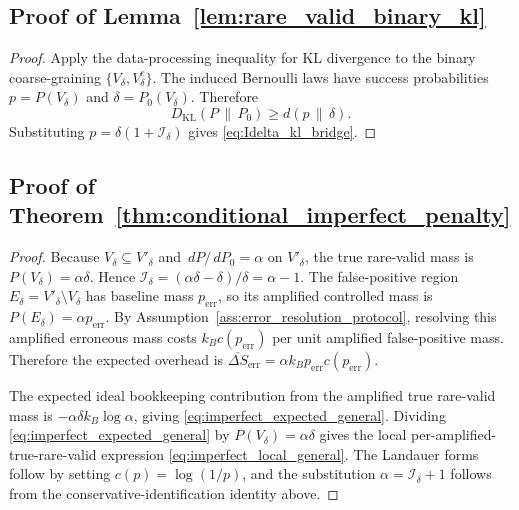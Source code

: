 \documentclass[
  aps,
  prresearch,
  reprint,
  amsmath,
  amssymb,
  superscriptaddress,
  nofootinbib,
  longbibliography
]{revtex4-2}
\newcommand{\KL}{D_{\mathrm{KL}}}
\newcommand{\calI}{\mathcal{I}}
\newcommand{\dd}{\,d}
\begin{document}
\subsection{Proof of Lemma~\ref{lem:rare_valid_binary_kl}}
\begin{proof}
Apply the data-processing inequality for KL divergence to the binary coarse-graining \(\{V_\delta,V_\delta^c\}\). The induced Bernoulli laws have success probabilities \(p=P(V_\delta)\) and \(\delta=P_0(V_\delta)\). Therefore
\[
    \KL(P\,\|\,P_0)
    \geq
    d(p\,\|\,\delta).
\]
Substituting \(p=\delta(1+\calI_\delta)\) gives \eqref{eq:Idelta_kl_bridge}.
\end{proof}

\subsection{Proof of Theorem~\ref{thm:conditional_imperfect_penalty}}
\begin{proof}
Because \(V_\delta\subseteq V'_\delta\) and \(\dd P/\dd P_0=\alpha\) on \(V'_\delta\), the true rare-valid mass is \(P(V_\delta)=\alpha\delta\). Hence \(\calI_\delta=(\alpha\delta-\delta)/\delta=\alpha-1\). The false-positive region \(E_\delta=V'_\delta\setminus V_\delta\) has baseline mass \(p_{\mathrm{err}}\), so its amplified controlled mass is \(P(E_\delta)=\alpha p_{\mathrm{err}}\). By Assumption~\ref{ass:error_resolution_protocol}, resolving this amplified erroneous mass costs \(k_Bc(p_{\mathrm{err}})\) per unit amplified false-positive mass. Therefore the expected overhead is \(\overline{\Delta S}_{\mathrm{err}}=\alpha k_B p_{\mathrm{err}}c(p_{\mathrm{err}})\).

The expected ideal bookkeeping contribution from the amplified true rare-valid mass is \(-\alpha\delta k_B\log\alpha\), giving \eqref{eq:imperfect_expected_general}. Dividing \eqref{eq:imperfect_expected_general} by \(P(V_\delta)=\alpha\delta\) gives the local per-amplified-true-rare-valid expression \eqref{eq:imperfect_local_general}. The Landauer forms follow by setting \(c(p)=\log(1/p)\), and the substitution \(\alpha=\calI_\delta+1\) follows from the conservative-identification identity above.
\end{proof}
\end{document}

